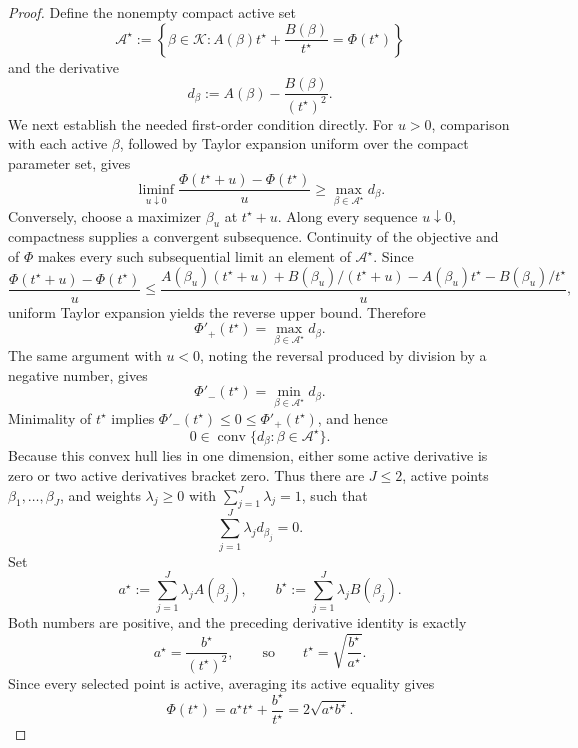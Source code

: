 \documentclass{article}
\begin{document}
\begin{proof}
Define the nonempty compact active set
\[
 \mathcal A^\star
 :=\left\{\beta\in\mathcal K:
 A(\beta)t^\star+\frac{B(\beta)}{t^\star}
 =\Phi(t^\star)\right\}
\]
and the derivative
\[
 d_\beta:=A(\beta)-\frac{B(\beta)}{(t^\star)^2}.
\]
We next establish the needed first-order condition directly.  For \(u>0\), comparison with each active \(\beta\), followed by Taylor expansion uniform over the compact parameter set, gives
\[
 \liminf_{u\downarrow0}
 \frac{\Phi(t^\star+u)-\Phi(t^\star)}{u}
 \ge \max_{\beta\in\mathcal A^\star}d_\beta.
\]
Conversely, choose a maximizer \(\beta_u\) at \(t^\star+u\).  Along every sequence \(u\downarrow0\), compactness supplies a convergent subsequence.  Continuity of the objective and of \(\Phi\) makes every such subsequential limit an element of \(\mathcal A^\star\).  Since
\[
 \frac{\Phi(t^\star+u)-\Phi(t^\star)}{u}
 \le
 \frac{A(\beta_u)(t^\star+u)+B(\beta_u)/(t^\star+u)
       -A(\beta_u)t^\star-B(\beta_u)/t^\star}{u},
\]
uniform Taylor expansion yields the reverse upper bound.  Therefore
\[
 \Phi'_+(t^\star)=\max_{\beta\in\mathcal A^\star}d_\beta.
\]
The same argument with \(u<0\), noting the reversal produced by division by a negative number, gives
\[
 \Phi'_-(t^\star)=\min_{\beta\in\mathcal A^\star}d_\beta.
\]
Minimality of \(t^\star\) implies \(\Phi'_-(t^\star)\le0\le\Phi'_+(t^\star)\), and hence
\[
 0\in\operatorname{conv}
 \{d_\beta:\beta\in\mathcal A^\star\}.
\]
Because this convex hull lies in one dimension, either some active derivative is zero or two active derivatives bracket zero.  Thus there are \(J\le2\), active points \(\beta_1,\ldots,\beta_J\), and weights \(\lambda_j\ge0\) with \(\sum_{j=1}^J\lambda_j=1\), such that
\[
 \sum_{j=1}^J\lambda_jd_{\beta_j}=0.
\]
Set
\[
 a^\star:=\sum_{j=1}^J\lambda_jA(\beta_j),
 \qquad
 b^\star:=\sum_{j=1}^J\lambda_jB(\beta_j).
\]
Both numbers are positive, and the preceding derivative identity is exactly
\[
 a^\star=\frac{b^\star}{(t^\star)^2},
 \qquad\text{so}\qquad
 t^\star=\sqrt{\frac{b^\star}{a^\star}}.
\]
Since every selected point is active, averaging its active equality gives
\[
 \Phi(t^\star)
 =a^\star t^\star+\frac{b^\star}{t^\star}
 =2\sqrt{a^\star b^\star}.
\tag{1}
\]


\end{proof}
\end{document}
